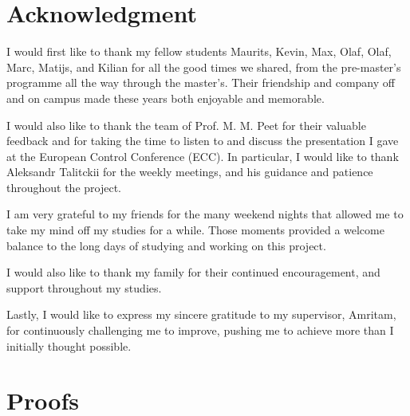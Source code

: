\documentclass[final,5p,twocolumn]{elsarticle}
\begin{document}
\section*{Acknowledgment}
I would first like to thank my fellow students Maurits, Kevin, Max, Olaf,
Olaf, Marc, Matijs, and Kilian for all the good times we shared, from the
pre-master's programme all the way through the master's. Their friendship
and company off and on campus made these years both enjoyable and memorable.

I would also like to thank the team of Prof. M. M. Peet for their valuable
feedback and for taking the time to listen to and discuss the presentation
I gave at the European Control Conference (ECC). In particular, I would
like to thank Aleksandr Talitckii for the weekly meetings, and his guidance
and patience throughout the project.

I am very grateful to my friends for the many weekend nights that allowed
me to take my mind off my studies for a while. Those moments provided a
welcome balance to the long days of studying and working on this project.

I would also like to thank my family for their continued encouragement,
and support throughout my studies.

Lastly, I would like to express my sincere gratitude to my supervisor,
Amritam, for continuously challenging me to improve, pushing me to achieve
more than I initially thought possible.




\onecolumn
\appendix
\renewcommand{\thesubsection}{\thesection.\arabic{subsection}}
\section{Proofs}




\vspace{12pt}
\end{document}
